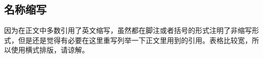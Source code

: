 

\begin{landscape}
{
\renewcommand{\clearpage}{}
\renewcommand{\newpage}{}
\chapter{名称缩写}
}

{
因为在正文中多数引用了英文缩写，虽然都在脚注或者括号的形式注明了非缩写形式，但是还是觉得有必要在这里重写列举一下正文里用到的引用。表格比较宽，所以使用横式排版，请谅解。
}
\begin{center}








\end{center}
\end{landscape}
